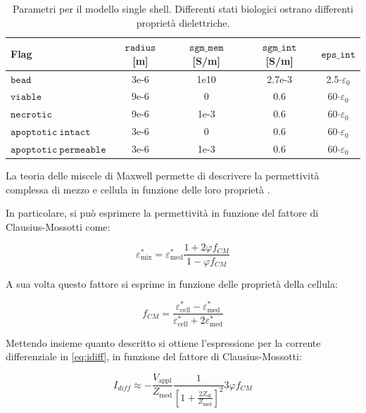 \begin{table}[t!]
	\centering
	\small{
		\begin{tabular}{|l|c|c|c|c|}
			\hline
			Flag & $\mathtt{radius}$ [m] & $\mathtt{sgm\_mem}$ [S/m] &$\mathtt{ sgm\_int}$ [S/m] & $\mathtt{eps\_int }$ \\
			\hline
			$\mathtt{bead}$ & 3e-6 & 1e10 & 2.7e-3 & 2.5$\cdot \varepsilon_0$ \\
			\hline
			$\mathtt{viable}$ & 9e-6 & 0 & 0.6 & 60$\cdot \varepsilon_0$ \\
			\hline
			$\mathtt{necrotic}$ & 9e-6 & 1e-3 & 0.6 & 60$\cdot \varepsilon_0$ \\
			\hline
			$\mathtt{apoptotic \:intact}$ & 3e-6 & 0 & 0.6 & 60$\cdot \varepsilon_0$\\
			\hline
			$\mathtt{apoptotic\: permeable}$ & 3e-6 & 1e-3 & 0.6 & 60$\cdot \varepsilon_0$ \\
			\hline
	\end{tabular}}
	\caption{Parametri per il modello single shell. Differenti stati biologici ostrano differenti proprietà dielettriche.}
	\label{tab:data}
\end{table}


La teoria delle miscele di Maxwell permette di descrivere la permettività complessa di mezzo e cellula in funzione delle loro proprietà \cite{hanai_method_1975}.

In particolare, si può esprimere la permettività in funzione del fattore di Clausius-Mossotti come:

\begin{equation}
	\varepsilon_{\operatorname{mix}}^{*}=\varepsilon_{\operatorname{m e d}}^{*} \frac{1+2 \varphi f_{C M}}{1-\varphi f_{C M}}
	\label{eq:permett}
\end{equation}

A sua volta questo fattore si esprime in funzione delle proprietà della cellula:

\begin{equation}
	f_{C M}=\frac{\varepsilon_{\operatorname{c e l l}}^{*}-\varepsilon_{\operatorname{m e d}}^{*}}{\varepsilon_{\operatorname{c e l l}}^{*}+2 \varepsilon_{\operatorname{m e d}}^{*}}
\end{equation}

Mettendo insieme quanto descritto si ottiene l'espressione per la corrente differenziale in \cref{eq:idiff}, in funzione del fattore di Clausius-Mossotti:

\begin{equation}
	I_{d i f f} \approx-\frac{V_{\operatorname{a p p l}}}{Z_{\operatorname{m e d}}} \frac{1}{\left[1+\frac{2 Z_{d l}}{Z_{\operatorname{m e d}}}\right]^{2}} 3 \varphi f_{CM}
\end{equation}

